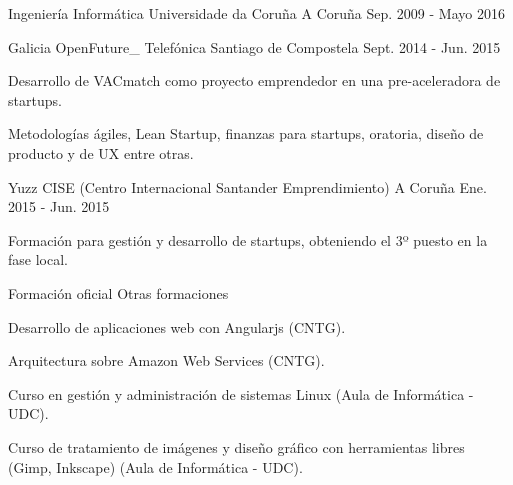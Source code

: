 


\begin{cventries}


\cventry
{Ingeniería Informática} %
{Universidade da Coruña} %
{A Coruña} %
{Sep. 2009 - Mayo 2016} %
{ %
\begin{cvitems}
\end{cvitems}
}


\cventry
{Galicia OpenFuture\_} %
{Telefónica} %
{Santiago de Compostela} %
{Sept. 2014 - Jun. 2015} %
{ %
\begin{cvitems}
\item {Desarrollo de VACmatch como proyecto emprendedor en una pre-aceleradora de startups.}
\item {Metodologías ágiles, Lean Startup, finanzas para startups, oratoria, diseño de producto y de UX entre otras.}
\end{cvitems}
}



\cventry
{Yuzz} %
{CISE (Centro Internacional Santander Emprendimiento)} %
{A Coruña} %
{Ene. 2015 - Jun. 2015} %
{ %
\begin{cvitems}
\item {Formación para gestión y desarrollo de startups, obteniendo el 3º puesto 
en la fase local.}
\end{cvitems}
}


\cventry
{Formación oficial} %
{Otras formaciones} %
{} %
{} %
{ %
\begin{cvitems}
\item {Desarrollo de aplicaciones web con Angularjs (CNTG).}
\item {Arquitectura sobre Amazon Web Services (CNTG).}
\item {Curso en gestión y administración de sistemas Linux (Aula de Informática - UDC).}
\item {Curso de tratamiento de imágenes y diseño gráfico con herramientas libres (Gimp, Inkscape) (Aula de Informática - UDC).}
\end{cvitems}
}


\end{cventries}
